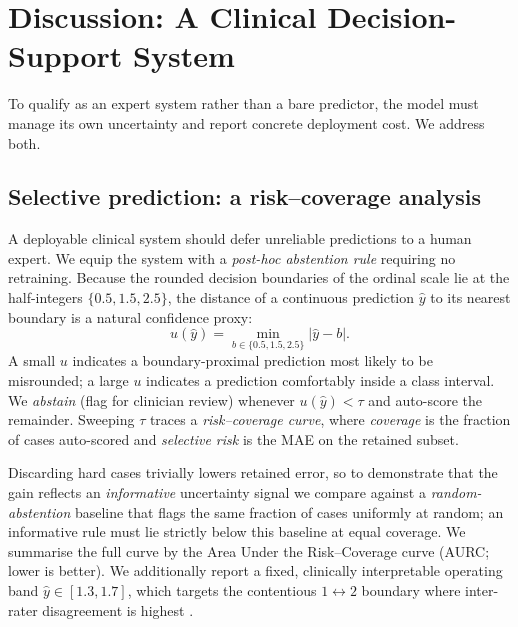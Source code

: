 \documentclass[preprint,12pt]{elsarticle}
\begin{document}
\section{Discussion: A Clinical Decision-Support System}
\label{sec:discussion}

To qualify as an expert system rather than a bare predictor, the model must
manage its own uncertainty and report concrete deployment cost. We address both.

\subsection{Selective prediction: a risk--coverage analysis}
\label{sec:selective}
A deployable clinical system should defer unreliable predictions to a human
expert. We equip the system with a \emph{post-hoc abstention rule} requiring no
retraining. Because the rounded decision boundaries of the ordinal scale lie at
the half-integers $\{0.5,1.5,2.5\}$, the distance of a continuous prediction
$\hat{y}$ to its nearest boundary is a natural confidence proxy:
\begin{equation}
u(\hat{y}) = \min_{b\in\{0.5,1.5,2.5\}} \lvert \hat{y}-b\rvert .
\label{eq:uncertainty}
\end{equation}
A small $u$ indicates a boundary-proximal prediction most likely to be misrounded;
a large $u$ indicates a prediction comfortably inside a class interval. We
\emph{abstain} (flag for clinician review) whenever $u(\hat{y})<\tau$ and
auto-score the remainder. Sweeping $\tau$ traces a \emph{risk--coverage curve},
where \emph{coverage} is the fraction of cases auto-scored and \emph{selective
risk} is the MAE on the retained subset.

Discarding hard cases trivially lowers retained error, so to demonstrate that
the gain reflects an \emph{informative} uncertainty signal we compare against a
\emph{random-abstention} baseline that flags the same fraction of cases
uniformly at random; an informative rule must lie strictly below this baseline
at equal coverage. We summarise the full curve by the Area Under the
Risk--Coverage curve (AURC; lower is better). We additionally report a fixed,
clinically interpretable operating band $\hat{y}\in[1.3,1.7]$, which targets the
contentious $1\!\leftrightarrow\!2$ boundary where inter-rater disagreement is
highest \cite{richards1994inter}.
\end{document}
